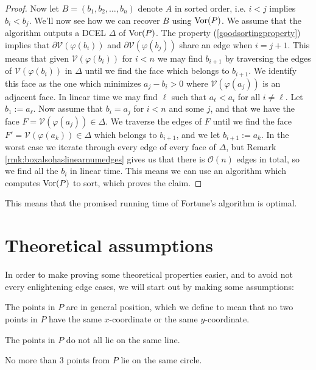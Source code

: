 \begin{proof}
Now let $B = (b_1, b_2, \ldots, b_n)$ denote $A$ in sorted order, i.e. $i < j$ implies $b_i < b_j$. We'll now see how we can recover $B$ using $\operatorname{Vor}(P)$. We assume that the algorithm outputs a DCEL $\Delta$ of $\operatorname{Vor}(P)$. The property (\ref{goodsortingproperty}) implies that $\partial \mathcal{V}(\varphi(b_i))$ and $\partial \mathcal{V}(\varphi(b_j))$ share an edge when $i = j + 1$. This means that given $\mathcal{V}(\varphi(b_i))$ for $i < n$ we may find $b_{i+1}$ by traversing the edges of $\mathcal{V}(\varphi(b_i))$ in $\Delta$ until we find the face which belongs to $b_{i+1}$. We identify this face as the one which minimizes $a_j - b_i > 0$ where $\mathcal{V}(\varphi(a_j))$ is an adjacent face. In linear time we may find $\ell$ such that $a_{\ell} < a_i$ for all $i \ne \ell$. Let $b_1 := a_{\ell}$. Now assume that $b_i = a_j$ for $i < n$ and some $j$, and that we have the face $F = \mathcal{V}(\varphi(a_j)) \in \Delta$. We traverse the edges of $F$ until we find the face $F' = \mathcal{V}(\varphi(a_k)) \in \Delta$ which belongs to $b_{i+1}$, and we let $b_{i+1} := a_k$. In the worst case we iterate through every edge of every face of $\Delta$, but Remark \ref{rmk:boxalsohaslinearnumedges} gives us that there is $\mathcal{O}(n)$ edges in total, so we find all the $b_i$ in linear time. This means we can use an algorithm which computes $\operatorname{Vor}(P)$ to sort, which proves the claim.
\end{proof}
This means that the promised running time of Fortune's algorithm is optimal.

\section{Theoretical assumptions}
In order to make proving some theoretical properties easier, and to avoid not every enlightening edge cases, we will start out by making some assumptions:

\begin{assume} \label{ass:generalposition}
The points in $P$ are in general position, which we define to mean that no two points in $P$ have the same $x$-coordinate or the same $y$-coordinate.
\end{assume}

\begin{assume} \label{ass:notsameline}
The points in $P$ do not all lie on the same line.
\end{assume}

\begin{assume} \label{ass:notcocircular}
No more than 3 points from $P$ lie on the same circle.
\end{assume}

